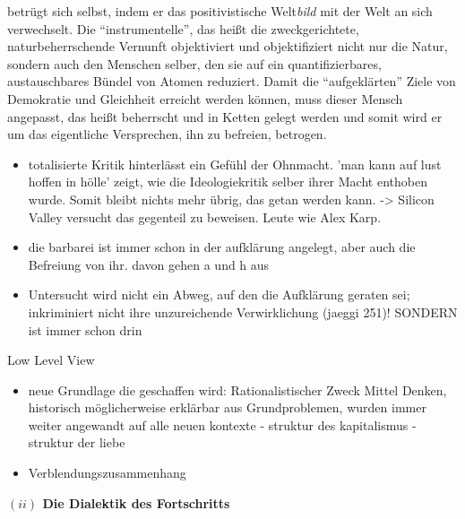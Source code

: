 \documentclass[a4paper, 12pt]{article}
\begin{document}
\begin{onehalfspace}
betrügt sich selbst, indem er das positivistische Welt\emph{bild} mit der Welt an sich verwechselt. Die "`instrumentelle"', das heißt die zweckgerichtete, naturbeherrschende Vernunft objektiviert und objektifiziert nicht nur die Natur, sondern auch den Menschen selber, den sie auf ein quantifizierbares, austauschbares Bündel von Atomen reduziert. Damit die "`aufgeklärten"' Ziele von Demokratie und Gleichheit erreicht werden können, muss dieser Mensch angepasst, das heißt beherrscht und in Ketten gelegt werden und somit wird er um das eigentliche Versprechen, ihn zu befreien, betrogen. 


\begin{itemize}
  \item totalisierte Kritik hinterlässt ein Gefühl der Ohnmacht. 'man kann auf lust hoffen in hölle' zeigt, wie die Ideologiekritik selber ihrer Macht enthoben wurde. Somit bleibt nichts mehr übrig, das getan werden kann. -> Silicon Valley versucht das gegenteil zu beweisen. Leute wie Alex Karp.
  \item die barbarei ist immer schon in der aufklärung angelegt, aber auch die Befreiung von ihr. davon gehen a und h aus
  \item Untersucht wird nicht ein Abweg, auf den die Aufklärung geraten sei; inkriminiert nicht ihre unzureichende Verwirklichung (jaeggi 251)! SONDERN ist immer schon drin
\end{itemize}

Low Level View

\begin{itemize}
  \item neue Grundlage die geschaffen wird: Rationalistischer Zweck Mittel Denken, historisch möglicherweise erklärbar aus Grundproblemen, wurden immer weiter angewandt auf alle neuen kontexte - struktur des kapitalismus - struktur der liebe
  \item Verblendungszusammenhang
\end{itemize}


\vspace{5mm}
\noindent\textbf{$(ii)$ Die Dialektik des Fortschritts}

\noindent 


\end{onehalfspace}
\end{document}
